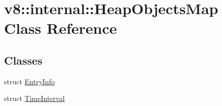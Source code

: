 \hypertarget{classv8_1_1internal_1_1_heap_objects_map}{}\section{v8\+:\+:internal\+:\+:Heap\+Objects\+Map Class Reference}
\label{classv8_1_1internal_1_1_heap_objects_map}
\subsection*{Classes}
\begin{DoxyCompactItemize}
\item 
struct \hyperlink{structv8_1_1internal_1_1_heap_objects_map_1_1_entry_info}{Entry\+Info}
\item 
struct \hyperlink{structv8_1_1internal_1_1_heap_objects_map_1_1_time_interval}{Time\+Interval}
\end{DoxyCompactItemize}
